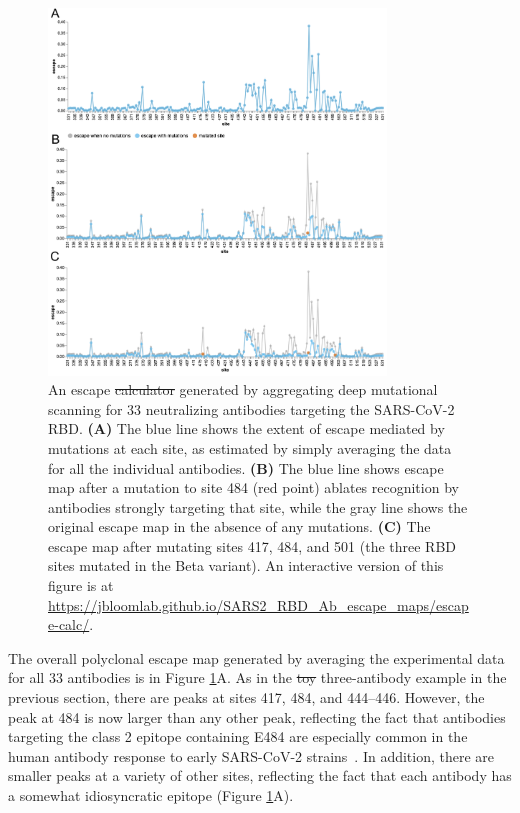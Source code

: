 \documentclass[9pt,twocolumn,twoside]{gsajnl_modified}
\providecommand{\DIFadd}[1]{{\protect\color{blue}\uwave{#1}}} %
\providecommand{\DIFdel}[1]{{\protect\color{red}\sout{#1}}}                      %
\providecommand{\DIFaddbegin}{} %
\providecommand{\DIFaddend}{} %
\providecommand{\DIFdelbegin}{} %
\providecommand{\DIFdelend}{} %
\begin{document}
\begin{figure}
\includegraphics[width=0.8\textwidth]{figures/escape_calc/escape_calc.pdf}
\caption{
An escape \DIFdelbegin \DIFdel{calculator }\DIFdelend \DIFaddbegin \DIFadd{estimator }\DIFaddend generated by aggregating deep mutational scanning for 33 neutralizing antibodies targeting the SARS-CoV-2 RBD.
{\bf (A)} The blue line shows the extent of escape mediated by mutations at each site, as estimated by simply averaging the data for all the individual antibodies.
{\bf (B)} The blue line shows escape map after a mutation to site 484 (red point) ablates recognition by antibodies strongly targeting that site, while the gray line shows the original escape map in the absence of any mutations.
{\bf (C)} The escape map after mutating sites 417, 484, and 501 (the three RBD sites mutated in the Beta variant).
An interactive version of this figure is at \url{https://jbloomlab.github.io/SARS2_RBD_Ab_escape_maps/escape-calc/}.}
\label{fig:escape_calc}
\end{figure}

The overall polyclonal escape map generated by averaging the experimental data for all 33 antibodies is in Figure \ref{fig:escape_calc}A.
As in the \DIFdelbegin \DIFdel{toy }\DIFdelend \DIFaddbegin \DIFadd{illustrative }\DIFaddend three-antibody example in the previous section, there are peaks at  sites 417, 484, and 444--446.
However, the peak at 484 is now larger than any other peak, reflecting the fact that antibodies targeting the class 2 epitope containing E484 are especially common in the human antibody response to early SARS-CoV-2 strains~\citep{yuan2020structural,robbiani2020convergent,greaney2021comprehensive,greaney2021mapping,chen2021convergent}.
In addition, there are smaller peaks at a variety of other sites, reflecting the fact that each antibody has a somewhat idiosyncratic epitope (Figure \ref{fig:escape_calc}A).
\end{document}
